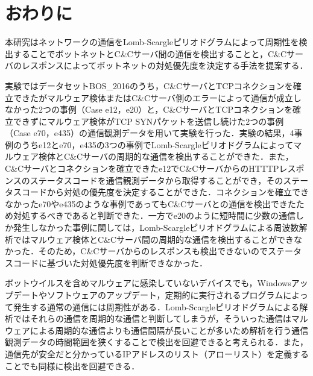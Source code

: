 \documentclass[twocolumn]{ltjsarticle}
\begin{document}
\section{おわりに}
本研究はネットワークの通信をLomb-Scargleピリオドグラムによって周期性を検出することでボットネットとC\&Cサーバ間の通信を検出することと，C\&Cサーバのレスポンスによってボットネットの対処優先度を決定する手法を提案する．

実験ではデータセットBOS\_2016のうち，C\&CサーバとTCPコネクションを確立できたがマルウェア検体またはC\&Cサーバ側のエラーによって通信が成立しなかった2つの事例（Case e12，e20）と，C\&CサーバとTCPコネクションを確立できずにマルウェア検体がTCP SYNパケットを送信し続けた2つの事例（Case e70，e435）の通信観測データを用いて実験を行った．実験の結果，4事例のうちe12とe70，e435の3つの事例でLomb-Scargleピリオドグラムによってマルウェア検体とC\&Cサーバの周期的な通信を検出することができた．また，C\&Cサーバとコネクションを確立できたe12でC\&CサーバからのHTTTPレスポンスのステータスコードを通信観測データから取得することができ，そのステータスコードから対処の優先度を決定することができた．コネクションを確立できなかったe70やe435のような事例であってもC\&Cサーバとの通信を検出できたため対処するべきであると判断できた．一方でe20のように短時間に少数の通信しか発生しなかった事例に関しては，Lomb-Scargleピリオドグラムによる周波数解析ではマルウェア検体とC\&Cサーバ間の周期的な通信を検出することができなかった．そのため，C\&Cサーバからのレスポンスも検出できないのでステータスコードに基づいた対処優先度を判断できなかった．

ボットウイルスを含めマルウェアに感染していないデバイスでも，Windowsアップデートやソフトウェアのアップデート，定期的に実行されるプログラムによって発生する通常の通信には周期性がある．Lomb-Scargleピリオドグラムによる解析ではそれらの通信を周期的な通信と判断してしまうが，そういった通信はマルウェアによる周期的な通信よりも通信間隔が長いことが多いため解析を行う通信観測データの時間範囲を狭くすることで検出を回避できると考えられる．また，通信先が安全だと分かっているIPアドレスのリスト（アローリスト）を定義することでも同様に検出を回避できる．



\end{document}
